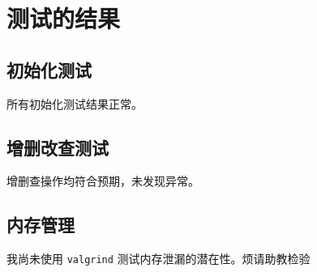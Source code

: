 \documentclass[UTF8]{ctexart}
\begin{document}
\section{测试的结果}

\subsection{初始化测试}
所有初始化测试结果正常。

\subsection{增删改查测试}
增删查操作均符合预期，未发现异常。

\subsection{内存管理}
我尚未使用 \texttt{valgrind} 测试内存泄漏的潜在性。烦请助教检验
\end{document}
